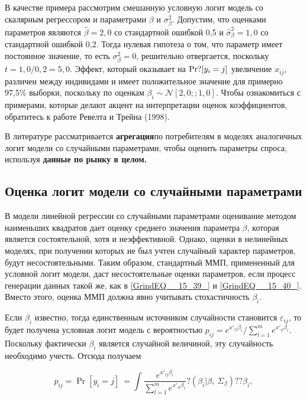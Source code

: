 В качестве примера рассмотрим смешанную условную логит модель со скалярным регрессором и параметрами $\beta $ и ${\sigma }^2_{\beta }.$ Допустим, что оценками параметров являются $\widehat{\beta }=2,0$ со стандартной ошибкой 0,5 и ${\widehat{\sigma }}^2_{\beta }=1,0$ со стандартной ошибкой 0,2. Тогда нулевая гипотеза о том, что параметр имеет постоянное значение, то есть ${\sigma }^2_{\beta }=0$, решительно отвергается, поскольку $t=1,0/0,2=5,0.$ Эффект, который оказывает на ${\rm Pr}?[y_i=j]$ увеличение $x_{ij}$, различен между индивидами и имеет положительное значение для примерно 97,5\% выборки, поскольку по оценкам ${\beta }_i\sim {\mathcal N}[2,0;;1,0]$. Чтобы ознакомиться с примерами, которые делают акцент на интерпретации оценок коэффициентов, обратитесь к работе Ревелта и Трейна (1998).

В литературе рассматривается \textbf{агрегация}по потребителям в моделях аналогичных логит модели со случайными параметрами, чтобы оценить параметры спроса, используя \textbf{данные по рынку в целом.}

\subsection{Оценка логит модели со случайными параметрами}

В модели линейной регрессии со случайными параметрами оценивание методом наименьших квадратов дает оценку среднего значения параметра $\beta $, которая является состоятельной, хотя и неэффективной. Однако, оценки в нелинейных моделях, при получении которых не был учтен случайный характер параметров, будут несостоятельными. Таким образом, стандартный ММП, примененный для условной логит модели, даст несостоятельные оценки параметров, если процесс генерации данных такой же, как в \eqref{GrindEQ__15_39_} и \eqref{GrindEQ__15_40_}. Вместо этого, оценка ММП должна явно учитывать стохастичность ${\beta }_i$.

Если ${\beta }_i$ известно, тогда единственным источником случайности становится ${\varepsilon }_{ij}$, то будет получена условная логит модель с вероятностью $p_{ij}={e^{x'_{ij}{\beta }_i}}/{\sum^m_{l=1}{e^{x'_{il}{\beta }_i}}}$. Поскольку фактически ${\beta }_i$ является случайной величиной, эту случайность необходимо учесть. Отсюда получаем

\begin{equation} \label{GrindEQ__15_41_} p_{ij}={\Pr  \left[y_i=j\right]\ }=\int{\frac{e^{x'_{ij}{\beta }_i}}{\sum^m_{l=1}{e^{x'_{il}{\beta }_i}}}?({\beta }_i|\beta ,\ {\Sigma }_{\beta })??{\beta }_i}, \end{equation} 

